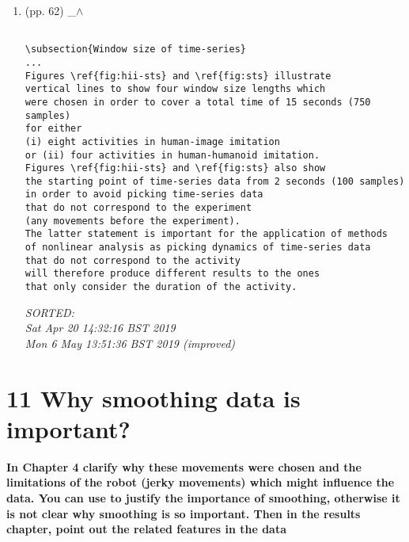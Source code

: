\documentclass[12pt]{article}
\begin{document}
\begin{enumerate}

\item  (pp. 62)  \_$\wedge$  	


	\begin{verbatim}
	
\subsection{Window size of time-series}
...
Figures \ref{fig:hii-sts} and \ref{fig:sts} illustrate  
vertical lines to show four window size lengths which 
were chosen in order to cover a total time of 15 seconds (750 samples)
for either
(i) eight activities in human-image imitation 
or (ii) four activities in human-humanoid imitation.
Figures \ref{fig:hii-sts} and \ref{fig:sts} also show 
the starting point of time-series data from 2 seconds (100 samples) 
in order to avoid picking time-series data 
that do not correspond to the experiment 
(any movements before the experiment).
The latter statement is important for the application of methods
of nonlinear analysis as picking dynamics of time-series data 
that do not correspond to the activity
will therefore produce different results to the ones 
that only consider the duration of the activity. 

	\end{verbatim}
	\textit{
	SORTED: \\
	Sat Apr 20 14:32:16 BST 2019 \\
	Mon  6 May 13:51:36 BST 2019 (improved)
	}
	\\


\end{enumerate}



\section*{11 Why smoothing data is important?}
\textbf{
In Chapter 4 clarify why these movements were chosen
and the limitations of the robot (jerky movements)
which might influence the data. You can use to justify 
the importance of smoothing, otherwise it is not clear
why smoothing is so important. 
Then in the results chapter, 
point out the related features in the data
}
\end{document}
